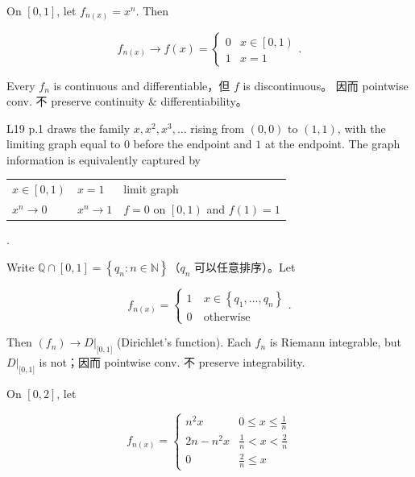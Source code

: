 \begin{example}

On \(\left\lbrack {0,1} \right\rbrack\), let \(f_{n{(x)}} = x^{n}\). Then

\[f_{n{(x)}}\rightarrow f(x) = \left\{ \begin{matrix}
0 & {x \in \left\lbrack {0,1} \right)} \\
1 & {x = 1}
\end{matrix} \right..\]

Every \(f_{n}\) is continuous and differentiable，但 \(f\) is discontinuous。 因而 pointwise conv. 不 preserve continuity \& differentiability。

L19 p.1 draws the family \(x,x^{2},x^{3},\ldots\) rising from \(\left( {0,0} \right)\) to \(\left( {1,1} \right)\), with the limiting graph equal to \(0\) before the endpoint and \(1\) at the endpoint. The graph information is equivalently captured by

{\def\LTcaptype{none} %
\begin{longtable}[]{@{}lll@{}}
\toprule\noalign{}
\endhead
\bottomrule\noalign{}
\endlastfoot
\(x \in \left\lbrack {0,1} \right)\) & \(x = 1\) & limit graph \\
\(x^{n}\rightarrow 0\) & \(x^{n}\rightarrow 1\) & \(f = 0\) on \(\left\lbrack {0,1} \right)\) and \(f(1) = 1\) \\
\end{longtable}
}

.

Write \(\mathbb{Q} \cap \left\lbrack {0,1} \right\rbrack = \left\{ {q_{n}:n \in \mathbb{N}} \right\}\)（\(q_{n}\) 可以任意排序）。Let

\[f_{n{(x)}} = \left\{ \begin{matrix}
1 & {x \in \left\{ {q_{1},\ldots,q_{n}} \right\}} \\
{0\ } & \text{otherwise}
\end{matrix} \right..\]

Then \(\left( f_{n} \right)\rightarrow D|_{\lbrack{0,1}\rbrack}\) (Dirichlet's function). Each \(f_{n}\) is Riemann integrable, but \(D|_{\lbrack{0,1}\rbrack}\) is not；因而 pointwise conv. 不 preserve integrability.

On \(\left\lbrack {0,2} \right\rbrack\), let

\[f_{n{(x)}} = \left\{ \begin{matrix}
{n^{2}x} & {0 \leq x \leq \frac{1}{n}} \\
{2n - n^{2}x} & {\frac{1}{n} < x < \frac{2}{n}} \\
0 & {\frac{2}{n} \leq x}
\end{matrix} \right.\]


\end{example}
